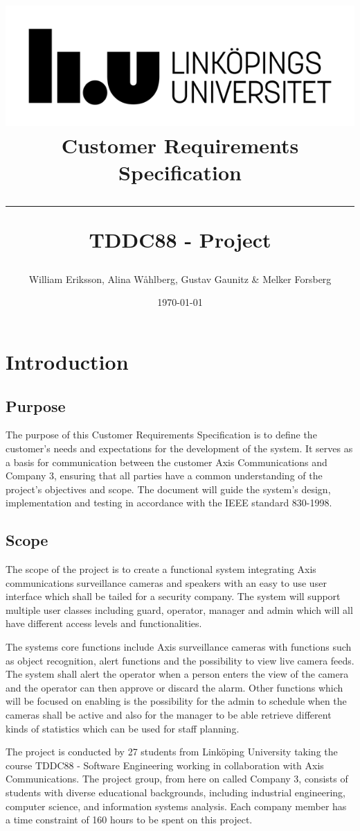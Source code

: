 \documentclass{article}
\title{
\includegraphics[scale=1.5]{liu_logga.png} \\
\vspace{2.0cm} \textbf{Customer Requirements Specification} \\
 \endgraf\rule{\textwidth}{.4pt}
  \large \textbf{TDDC88 - Project}\\
 
   }
\author{William Eriksson, Alina Wåhlberg, Gustav Gaunitz \& Melker Forsberg}
\date{\today}
\begin{document}
\maketitle
\newpage
 


\newpage
\tableofcontents
\newpage

\section{Introduction}


\subsection{Purpose}
The purpose of this Customer Requirements Specification is to define the customer’s needs and expectations for the development of the system. It serves as a basis for communication between the customer Axis Communications and Company 3, ensuring that all parties have a common understanding of the project’s objectives and scope. The document will guide the system's design, implementation and testing in accordance with the IEEE standard 830-1998.


\subsection{Scope}

The scope of the project is to create a functional system integrating Axis communications surveillance cameras and speakers with an easy to use user interface which shall be tailed for a security company. The system will support multiple user classes including guard, operator, manager and admin which will all have different access levels and functionalities. 

The systems core functions include Axis surveillance cameras with functions such as object recognition, alert functions and the possibility to view live camera feeds.  The system shall alert the operator when a person enters the view of the camera and the operator can then approve or discard the alarm. Other functions which will be focused on enabling is the possibility for the admin to schedule when the cameras shall be active and also for the manager to be able retrieve different kinds of statistics which can be used for staff planning. 

The project is conducted by 27 students from Linköping University taking the course TDDC88 - Software Engineering working in collaboration with Axis Communications. The project group, from here on called Company 3, consists of students with diverse educational backgrounds, including industrial engineering, computer science, and information systems analysis. Each company member has a time constraint of 160 hours to be spent on this project. 
\end{document}
